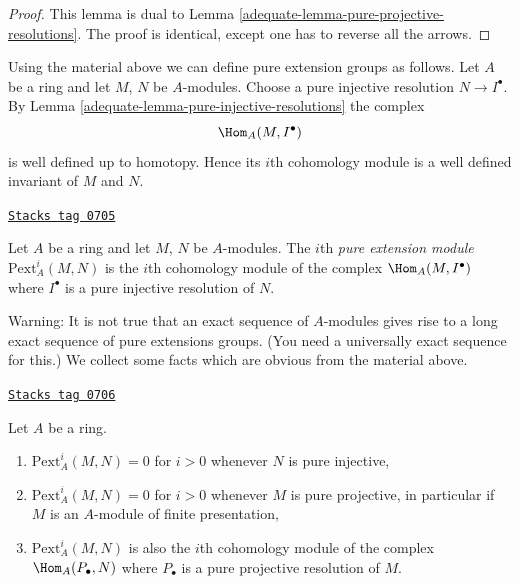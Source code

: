 \begin{proof}

This lemma is dual to
Lemma \ref{adequate-lemma-pure-projective-resolutions}.
The proof is identical, except one has to reverse all the arrows.
\end{proof}

Using the material above we can define pure extension groups as
follows. Let $A$ be a ring and let $M$, $N$ be $A$-modules.
Choose a pure injective resolution $N \to I^\bullet$. By
Lemma \ref{adequate-lemma-pure-injective-resolutions}
the complex
$$
\Hom_A(M, I^\bullet)
$$
is well defined up to homotopy. Hence its $i$th cohomology module
is a well defined invariant of $M$ and $N$.

\begin{definition}
\label{adequate-definition-pure-ext}
\href{https://stacks.math.columbia.edu/tag/0705}{\texttt{Stacks tag 0705}}

Let $A$ be a ring and let $M$, $N$ be $A$-modules.
The $i$th {\it pure extension module} $\text{Pext}^i_A(M, N)$
is the $i$th cohomology module of the complex
$\Hom_A(M, I^\bullet)$ where $I^\bullet$ is a pure injective
resolution of $N$.
\end{definition}

Warning: It is not true that an exact sequence of $A$-modules gives
rise to a long exact sequence of pure extensions groups. (You need
a universally exact sequence for this.)
We collect some facts which are obvious from the material above.

\begin{lemma}
\label{adequate-lemma-facts-pext}
\href{https://stacks.math.columbia.edu/tag/0706}{\texttt{Stacks tag 0706}}

Let $A$ be a ring.
\begin{enumerate}
\item $\text{Pext}^i_A(M, N) = 0$ for $i > 0$ whenever $N$ is pure injective,
\item $\text{Pext}^i_A(M, N) = 0$ for $i > 0$ whenever $M$ is pure projective,
in particular if $M$ is an $A$-module of finite presentation,
\item $\text{Pext}^i_A(M, N)$ is also the $i$th cohomology module
of the complex $\Hom_A(P_\bullet, N)$ where $P_\bullet$
is a pure projective resolution of $M$.
\end{enumerate}
\end{lemma}

